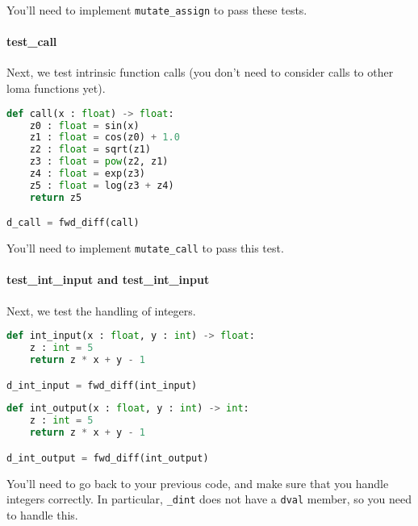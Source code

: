 You'll need to implement \lstinline{mutate_assign} to pass these tests.

\paragraph{test_call} Next, we test intrinsic function calls (you don't need to consider calls to other loma functions yet).
\begin{lstlisting}[language=Python]
def call(x : float) -> float:
    z0 : float = sin(x)
    z1 : float = cos(z0) + 1.0
    z2 : float = sqrt(z1)
    z3 : float = pow(z2, z1)
    z4 : float = exp(z3)
    z5 : float = log(z3 + z4)
    return z5

d_call = fwd_diff(call)
\end{lstlisting}
You'll need to implement \lstinline{mutate_call} to pass this test.

\paragraph{test_int_input and test_int_input} Next, we test the handling of integers.
\begin{lstlisting}[language=Python]
def int_input(x : float, y : int) -> float:
    z : int = 5
    return z * x + y - 1

d_int_input = fwd_diff(int_input)
\end{lstlisting}
\begin{lstlisting}[language=Python]
def int_output(x : float, y : int) -> int:
    z : int = 5
    return z * x + y - 1

d_int_output = fwd_diff(int_output)
\end{lstlisting}
You'll need to go back to your previous code, and make sure that you handle integers correctly. In particular, \lstinline{_dint} does not have a \lstinline{dval} member, so you need to handle this.

